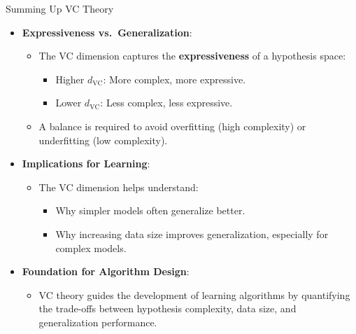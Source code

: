 \documentclass[
  ignorenonframetext,
]{beamer}
\providecommand{\tightlist}{%
  \setlength{\itemsep}{0pt}\setlength{\parskip}{0pt}}\usepackage{longtable,booktabs,array}
\begin{document}
\begin{frame}{Summing Up VC Theory}
\label{summing-up-vc-theory}
\begin{itemize}
\tightlist
\item
  \textbf{Expressiveness vs.~Generalization}:

  \begin{itemize}
  \tightlist
  \item
    The VC dimension captures the \textbf{expressiveness} of a
    hypothesis space:

    \begin{itemize}
    \tightlist
    \item
      Higher \(d_{\text{VC}}\): More complex, more expressive.
    \item
      Lower \(d_{\text{VC}}\): Less complex, less expressive.
    \end{itemize}
  \item
    A balance is required to avoid overfitting (high complexity) or
    underfitting (low complexity).
  \end{itemize}
\item
  \textbf{Implications for Learning}:

  \begin{itemize}
  \tightlist
  \item
    The VC dimension helps understand:

    \begin{itemize}
    \tightlist
    \item
      Why simpler models often generalize better.
    \item
      Why increasing data size improves generalization, especially for
      complex models.
    \end{itemize}
  \end{itemize}
\item
  \textbf{Foundation for Algorithm Design}:

  \begin{itemize}
  \tightlist
  \item
    VC theory guides the development of learning algorithms by
    quantifying the trade-offs between hypothesis complexity, data size,
    and generalization performance.
  \end{itemize}
\end{itemize}
\end{frame}
\end{document}
